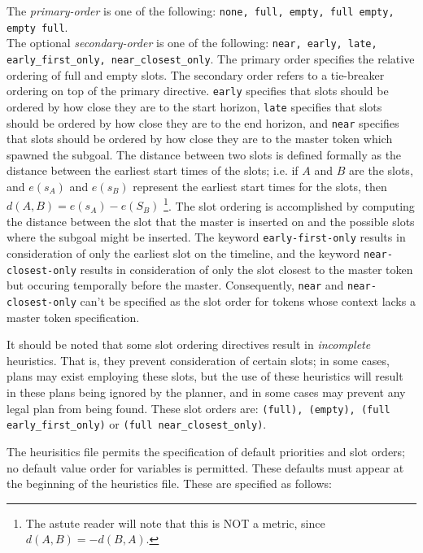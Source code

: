The {\em primary-order} is one of the following: {\tt none, full,
empty, full empty, empty full}.\\ The optional {\em secondary-order}
is one of the following: {\tt near, early, late, early\_first\_only, near\_closest\_only}.
The primary order specifies the relative ordering of full and empty
slots.  The secondary order refers to a tie-breaker ordering on top of
the primary directive.  {\tt early} specifies that slots should be
ordered by how close they are to the start horizon, {\tt late}
specifies that slots should be ordered by how close they are to the
end horizon, and {\tt near} specifies that slots should be ordered by
how close they are to the master token which spawned the subgoal.  
The distance between two slots is defined formally as the
distance between the earliest start times of the slots; i.e. if $A$
and $B$ are the slots, and $e(s_A)$ and $e(s_B)$ represent the
earliest start times for the slots, then $d(A,B)=e(s_A)-e(S_B)$
\footnote{ The astute reader will note that this is NOT a metric,
since $d(A,B) = -d(B,A)$.}.  The slot ordering is accomplished by
computing the distance between the slot that the master is inserted on
and the possible slots where the subgoal might be inserted.  
The
keyword {\tt early-first-only} results in consideration of only the
earliest slot on the timeline, and the keyword {\tt near-closest-only}
results in consideration of only the slot closest to the master token
but occuring temporally before the master.  Consequently, {\tt near} and
{\tt near-closest-only} can't be specified as the slot order for
tokens whose context lacks a master token specification.

It should be noted that some slot ordering directives 
result in {\em incomplete} heuristics.  That is, they prevent
consideration of certain slots; in some cases, plans may exist
employing these slots, but the use of these heuristics will result in
these plans being ignored by the planner, and in some cases may prevent
any legal plan from being found.
These slot orders are: {\tt (full), (empty), (full early\_first\_only)} 
or {\tt (full near\_closest\_only)}. 

The heurisitics file permits the specification of default priorities
and slot orders; no default value order for variables is permitted.
These defaults must appear at the beginning of the heuristics file.
These are specified as follows:

